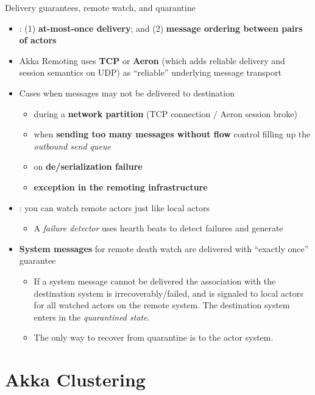 \documentclass[presentation, 9pt]{beamer}\mode<presentation>{\usetheme{AMSBolognaFC}}
\begin{document}
\begin{frame}[c]{Delivery guarantees, remote watch, and quarantine}
\begin{itemize}
	\item {}: (1) \textbf{at-most-once delivery}; and (2) \textbf{message ordering between pairs
	of actors}
	\item Akka Remoting uses \textbf{TCP} or \textbf{Aeron} (which adds reliable delivery and session semantics
	on UDP) as “reliable” underlying message transport
	\item Cases when messages may not be delivered to destination
	\begin{itemize}
		\item during a \textbf{network partition} (TCP connection / Aeron session broke)
  	\item when \textbf{sending too many messages without flow} control filling up the \emph{outbound send queue}
		\item on \textbf{de/serialization failure}
  	\item \textbf{exception in the remoting infrastructure}
	\end{itemize}
	\item {}: you can watch remote actors just like local actors
	\begin{itemize}
		\item A \emph{failure detector} uses hearth beats to detect failures and generate 
	\end{itemize}
 	\item \textbf{System messages} for remote death watch are delivered with “exactly once” guarantee
		\begin{itemize}
			\item If a system message cannot be delivered the association with the destination system is
			irrecoverably/failed, and  is signaled to local actors for all watched actors on the
		remote system. The destination system enters in the \emph{quarantined state}.
			\item The only way to recover from quarantine is to  the actor system.
		\end{itemize}
\end{itemize}
\end{frame}


\section{Akka Clustering}
\end{document}
